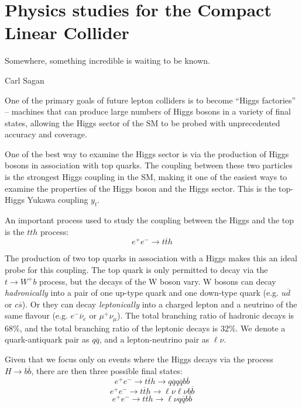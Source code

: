 \chapter{Physics studies for the Compact Linear Collider}
\label{chapter:analysis}

\epigraph{Somewhere, something incredible is waiting to be known.}{Carl Sagan}

One of the primary goals of future lepton colliders is to become ``Higgs factories'' -- machines that can produce large numbers of Higgs bosons in a variety of final states, allowing the Higgs sector of the \acrlong{SM} to be probed with unprecedented accuracy and coverage.

One of the best way to examine the Higgs sector is via the production of Higgs bosons in association with top quarks. The coupling between these two particles is the strongest Higgs coupling in the \acrshort{SM}, making it one of the easiest ways to examine the properties of the Higgs boson and the Higgs sector. This is the top-Higgs Yukawa coupling $y_t$.

An important process used to study the coupling between the Higgs and the top is the $tth$ process:
$$
e^+ e^- \rightarrow t\overline{t}h
$$

The production of two top quarks in association with a Higgs makes this an ideal probe for this coupling. The top quark is only permitted to decay via the $t \rightarrow W^+ b $ process, but the decays of the W boson vary. W bosons can decay \textit{hadronically} into a pair of one up-type quark and one down-type quark (e.g. $u\overline{d}$ or $c\overline{s}$). Or they can decay \textit{leptonically} into a charged lepton and a neutrino of the same flavour (e.g. $e^- \overline{\nu}_e$ or $\mu^+ \nu_\mu$). The total branching ratio of hadronic decays is 68\%, and the total branching ratio of the leptonic decays is 32\%. We denote a quark-antiquark pair as $q\overline{q}$, and a lepton-neutrino pair as $\ell \nu$.

Given that we focus only on events where the Higgs decays via the process $H \rightarrow b\overline{b}$, there are then three possible final states:
$$
e^+ e^- \rightarrow t\overline{t}h \rightarrow q\overline{q}q\overline{q}b\overline{b}
$$
$$
e^+ e^- \rightarrow t\overline{t}h \rightarrow \ell \nu \ell \nu b \overline{b}
$$
$$
e^+ e^- \rightarrow t\overline{t}h \rightarrow \ell \nu q \overline{q} b \overline{b}
$$

